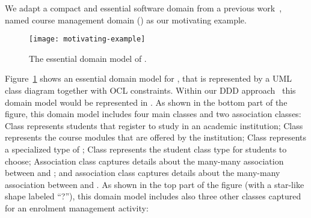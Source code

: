 We adapt a compact and essential software domain from a previous work~\cite{le_domain_2018}, named course management domain (\courseman) as our motivating example. %

\begin{figure}[th]
	\begin{center}
		\texttt{[image: motivating-example]}
	\end{center}
	\caption{The essential domain model of \courseman.}
	\label{fig:motivatingExample}
\end{figure}

Figure~\ref{fig:motivatingExample} shows an essential domain model for , that is represented by a UML class diagram together with OCL constraints. Within our DDD approach~\cite{le_domain_2018} this domain model would be represented in \dcsl. As shown in the bottom part of the figure, this domain model includes four main classes and two association classes: Class  represents students that register to study in an academic institution; Class  represents the course modules that are offered by the institution; Class  represents a specialized type of ; Class  represents the student class type for students to choose; Association class  captures details about the many-many association between  and ; and association class  captures details about the many-many association between  and .
As shown in the top part of the figure (with a star-like shape labeled ``?''), this domain model includes also three other classes captured for an enrolment management activity: 
%

